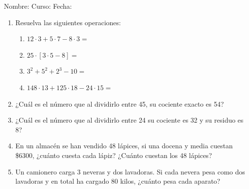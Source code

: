 \documentclass[letterpaper,fleqn]{article}
\newcommand{\LineaNombre}{%
\par
\vspace{\baselineskip}
Nombre:\hrulefill \; Curso: \underline{\hspace*{48pt}} \; Fecha: \underline{\hspace*{2.5cm}} \relax
\par}
\begin{document}
\LineaNombre
\begin{enumerate}
\item Resuelva las siguientes operaciones:
\begin{enumerate}
\item $12\cdot 3+5\cdot 7-8\cdot 3=$ \noanswer
\item $25\cdot [3\cdot 5-8]=$ \noanswer
\item $3^{2}+5^{2}+2^{3}-10=$\noanswer
\item $148\cdot 13+125\cdot 18-24\cdot 15=$  \noanswer
\end{enumerate}
 \item ¿Cuál es el número que al dividirlo entre 45, su cociente exacto es 54?\noanswer
 \newpage
 \item ¿Cuál es el número que al dividirlo entre 24 su cociente es 32 y su residuo es 8? \noanswer
 \item En un almacén se han vendido 48 lápices, si una docena y media cuestan \$6300, ¿cuánto cuesta cada lápiz? ¿Cuánto cuestan los 48 lápices?\noanswer
 \item Un camionero carga 3 neveras y dos lavadoras. Si cada nevera pesa como dos lavadoras y en total ha cargado 80 kilos, ¿cuánto pesa cada aparato?\noanswer
 \end{enumerate}
\end{document}
